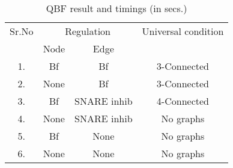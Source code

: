 \begin{table}[t]
	\centering
	    \def\arraystretch{1.2}
		\begin{tabular}[t]{ c|c c|c }\hline
			
			{\multirow{2}{*} {Sr.No}}  & \multicolumn{2}{c|}{Regulation} &
			{\multirow{2}{*} {Universal condition}} 
			
			

			
			\\
			\cline{2-3}
			{} & {Node} & {Edge} 
			
			\\\hline
			1. & Bf & Bf & 3-Connected   \\\hline
			2. & None & Bf  & 3-Connected   \\\hline
			3. & Bf & SNARE inhib & 4-Connected  \\\hline
			4. & None & SNARE inhib   & No graphs  \\\hline
			5. & Bf & None  & No graphs   \\\hline
			6. &  None & None  & No graphs   \\\hline
			
	\end{tabular}
	\caption{ QBF result and timings (in secs.)}
	\label{tab:qbf-graph}
\end{table}